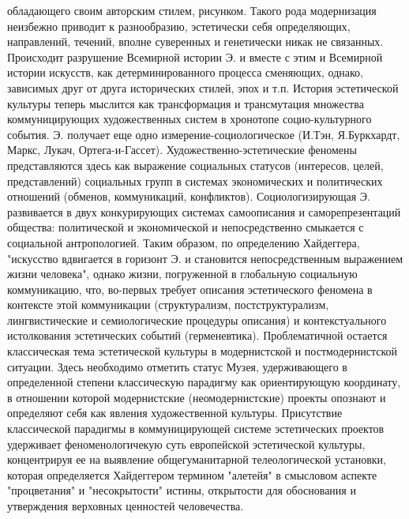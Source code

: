 \documentclass[12pt]{article}
\begin{document}
обладающего  своим  авторским  стилем,  рисунком.  Такого  рода  модернизация  неизбежно  приводит  к
разнообразию, эстетически себя определяющих, направлений, течений, вполне суверенных и генетически никак
не связанных. Происходит разрушение Всемирной истории Э. и вместе с этим и Всемирной истории искусств,
как детерминированного процесса сменяющих, однако, зависимых друг от друга исторических стилей, эпох и
т.п.  История  эстетической  культуры  теперь  мыслится  как  трансформация  и  трансмутация  множества
коммуницирующих художественных систем в хронотопе социо-культурного события. Э. получает еще одно
измерение-социологическое (И.Тэн, Я.Буркхардт, Маркс, Лукач, Ортега-и-Гассет). Художественно-эстетические 
феномены  представляются  здесь  как  выражение  социальных  статусов  (интересов,  целей,  представлений)
социальных  групп  в  системах  экономических  и  политических  отношений  (обменов,  коммуникаций,
конфликтов).  Социологизирующая  Э.  развивается  в  двух  конкурирующих  системах  самоописания  и
саморепрезентаций  общества:  политической  и  экономической  и  непосредственно  смыкается  с  социальной
антропологией. Таким образом, по определению Хайдеггера, "искусство вдвигается в горизонт Э. и становится
непосредственным  выражением  жизни  человека",  однако  жизни,  погруженной  в  глобальную  социальную
коммуникацию,  что,  во-первых  требует  описания  эстетического  феномена  в  контексте  этой  коммуникации
(структурализм,  постструктурализм,  лингвистические  и  семиологические  процедуры  описания)  и
контекстуального истолкования эстетических событий (герменевтика). Проблематичной остается классическая
тема  эстетической  культуры  в  модернистской  и  постмодернистской  ситуации.  Здесь  необходимо  отметить
статус  Музея,  удерживающего  в  определенной  степени  классическую  парадигму  как  ориентирующую
координату, в отношении которой модернистские (неомодернистские) проекты опознают и определяют себя как
явления  художественной  культуры.  Присутствие  классической  парадигмы  в  коммуницирующей  системе
эстетических проектов удерживает феноменологичекую суть европейской эстетической культуры, концентрируя
ее на выявление общегуманитарной телеологической установки, которая определяется Хайдеггером термином
"алетейя"  в  смысловом  аспекте  "процветания"  и  "несокрытости"  истины,  открытости  для  обоснования  и
утверждения верховных ценностей человечества.

\newpage
\end{document}
